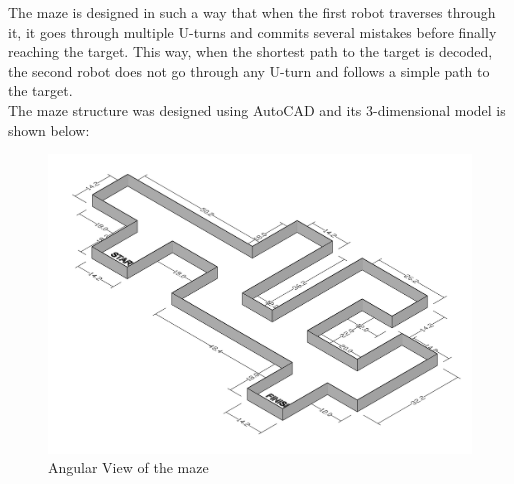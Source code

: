\justify The maze is designed in such a way that when the first robot traverses through it, it goes through multiple U-turns and commits several mistakes before finally reaching the target. This way, when the shortest path to the target is decoded, the second robot does not go through any U-turn and follows a simple path to the target.\\
The maze structure was designed using AutoCAD and its 3-dimensional model is shown below:
\begin{figure}[h]
\center
\includegraphics[scale=0.6]{maze2.jpg}   
\caption{Angular View of the maze}
\end{figure}
